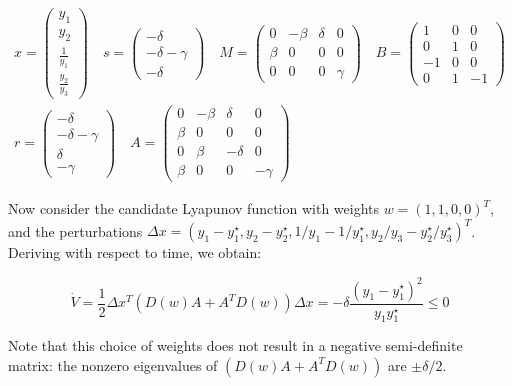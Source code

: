 \documentclass{article}
\begin{document}
\begin{equation}
\begin{aligned}
x = \begin{pmatrix}
y_1\\
y_2\\
\frac{1}{y_1}\\
\frac{y_2}{y_3}
\end{pmatrix}
\quad
s = \begin{pmatrix}
-\delta \\
-\delta - \gamma \\
-\delta
\end{pmatrix}
\quad
M = \begin{pmatrix}
0 & -\beta & \delta & 0\\
\beta & 0 & 0 & 0 \\
0 & 0 & 0 & \gamma
\end{pmatrix}
\quad
B = \begin{pmatrix}
1 & 0 & 0\\
0 & 1 & 0\\
-1 & 0 & 0\\
0 & 1 & -1
\end{pmatrix}
\\
r = \begin{pmatrix}
-\delta \\
-\delta - \gamma \\
\delta\\
-\gamma
\end{pmatrix}
\quad 
A = \begin{pmatrix}
0 & -\beta & \delta & 0 \\
\beta & 0 & 0 & 0\\
0 & \beta & -\delta & 0 \\
\beta & 0 & 0 & -\gamma
\end{pmatrix}
\end{aligned}
\end{equation}

Now consider the candidate Lyapunov function with weights
\(w = (1,1,0,0)^T\), and the perturbations
\(\Delta x = (y_1 - y_1^\star, y_2 - y_2^\star, 1/y_1 - 1 / y_1^\star, y_2 / y_3 - y_2^\star / y_3^\star)^T\).
Deriving with respect to time, we obtain:

\begin{equation}
\dot{V} = \frac{1}{2} \Delta x^T (D(w) A + A^T D(w)) \Delta x =  - \delta \frac{(y_1 - y_1^\star)^2}{y_1 y_1^\star} \leq 0
\end{equation}

Note that this choice of weights does not result in a negative
semi-definite matrix: the nonzero eigenvalues of \((D(w) A + A^T D(w))\)
are \(\pm \delta / 2\).
\end{document}
